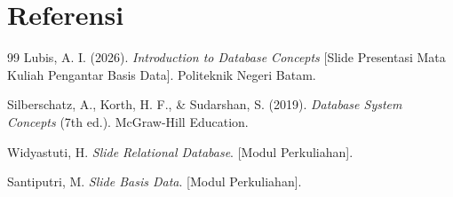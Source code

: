 \documentclass[11pt,a4paper]{article}
\begin{document}
\newpage
\section*{Referensi}

\begin{thebibliography}{99}
	Lubis, A. I. (2026). \textit{Introduction to Database Concepts} [Slide Presentasi Mata Kuliah Pengantar Basis Data]. Politeknik Negeri Batam.

	Silberschatz, A., Korth, H. F., \& Sudarshan, S. (2019). \textit{Database System Concepts} (7th ed.). McGraw-Hill Education.

	Widyastuti, H. \textit{Slide Relational Database}. [Modul Perkuliahan].

	Santiputri, M. \textit{Slide Basis Data}. [Modul Perkuliahan].
\end{thebibliography}
\end{document}
